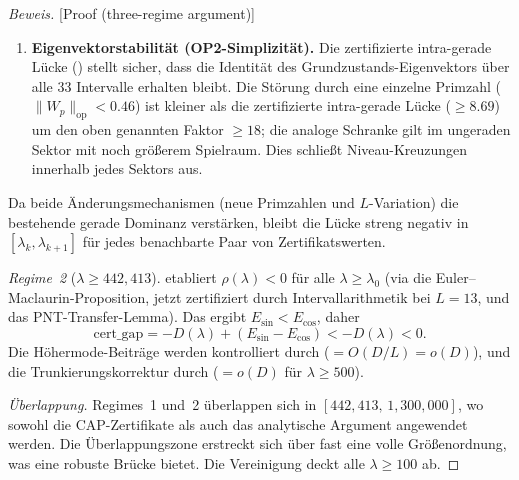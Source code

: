 \documentclass[12pt,a4paper]{article}
\theoremstyle{definition}
\theoremstyle{remark}
\begin{document}
\begin{proof}[Beweis][Proof (three-regime argument)]
\begin{enumerate}[label=(\roman*)]
  \item \textbf{Eigenvektorstabilität (OP2-Simplizität).}
    Die zertifizierte intra-gerade Lücke () stellt sicher, dass die Identität des Grundzustands-Eigenvektors über alle $33$ Intervalle erhalten bleibt.
    Die Störung durch eine einzelne Primzahl ($\|W_p\|_{\mathrm{op}} < 0.46$) ist kleiner als die zertifizierte intra-gerade Lücke ($\geq 8.69$) um den oben genannten Faktor $\geq 18$; die analoge Schranke gilt im ungeraden Sektor mit noch größerem Spielraum.
    Dies schließt Niveau-Kreuzungen innerhalb jedes Sektors aus.
\end{enumerate}

\noindent Da beide Änderungsmechanismen (neue Primzahlen und $L$-Variation) die bestehende gerade Dominanz verstärken, bleibt die Lücke streng negativ in $[\lambda_k, \lambda_{k+1}]$ für jedes benachbarte Paar von Zertifikatswerten.

\emph{Regime~2} ($\lambda \geq 442{,}413$).  etabliert $\rho(\lambda) < 0$ für alle $\lambda \geq \lambda_0$ (via die Euler--Maclaurin-Proposition, jetzt zertifiziert durch Intervallarithmetik bei $L = 13$, und das PNT-Transfer-Lemma). Das ergibt $E_{\sin} < E_{\cos}$, daher
\[
  \mathrm{cert\_gap} = -D(\lambda) + (E_{\sin} - E_{\cos}) < -D(\lambda) < 0.
\]
Die Höhermode-Beiträge werden kontrolliert durch  ($= O(D/L) = o(D)$), und die Trunkierungskorrektur durch  ($= o(D)$ für $\lambda \geq 500$).

\emph{Überlappung.} Regimes~1 und~2 überlappen sich in $[442{,}413,\, 1{,}300{,}000]$, wo sowohl die CAP-Zertifikate als auch das analytische Argument angewendet werden. Die Überlappungszone erstreckt sich über fast eine volle Größenordnung, was eine robuste Brücke bietet. Die Vereinigung deckt alle $\lambda \geq 100$ ab.
\end{proof}
\end{document}
